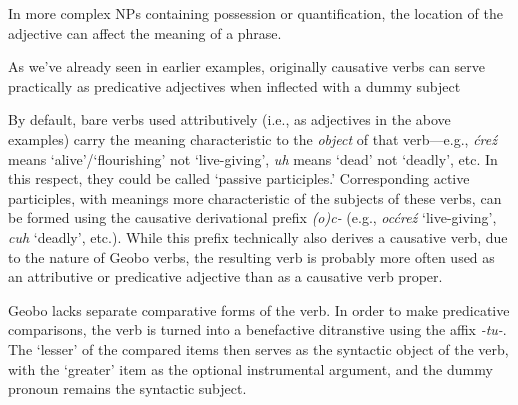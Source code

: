 \documentclass[a4paper,11pt,oneside,openany]{memoir}
\begin{document}

In more complex NPs containing possession or quantification, the location of the adjective can affect the meaning of a phrase.


As we've already seen in earlier examples, originally causative verbs can serve practically as predicative adjectives when inflected with a dummy subject


By default, bare verbs used attributively (i.e., as adjectives in the above examples) carry the meaning characteristic to the \textit{object} of that verb---e.g., \textit{\'cre\'z} means `alive'/`flourishing' not `live-giving', \textit{uh} means `dead' not `deadly', etc. In this respect, they could be called `passive participles.' Corresponding active participles, with meanings more characteristic of the subjects of these verbs, can be formed using the causative derivational prefix \textit{(o)c-} (e.g., \textit{oc\'cre\'z} `live-giving', \textit{cuh} `deadly', etc.). While this prefix technically also derives a causative verb, due to the nature of Geobo{\engma} verbs, the resulting verb is probably more often used as an attributive or predicative adjective than as a causative verb proper.


Geobo{\engma} lacks separate comparative forms of the verb. In order to make predicative comparisons, the verb is turned into a benefactive ditranstive using the affix \textit{-tu-}. The `lesser' of the compared items then serves as the syntactic object of the verb, with the `greater' item as the optional instrumental argument, and the dummy pronoun remains the syntactic subject.
\end{document}
